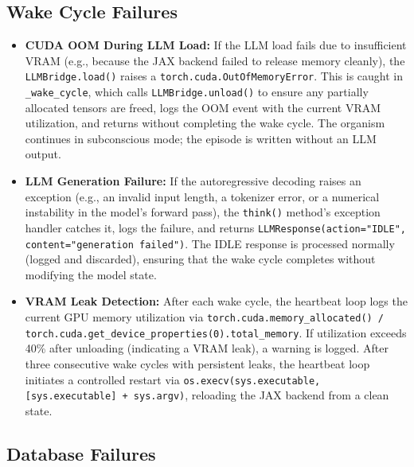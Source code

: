 \subsection{Wake Cycle Failures}

\begin{itemize}
    \item \textbf{CUDA OOM During LLM Load:} If the LLM load fails due to insufficient VRAM (e.g., because the JAX backend failed to release memory cleanly), the \texttt{LLMBridge.load()} raises a \texttt{torch.cuda.OutOfMemoryError}. This is caught in \texttt{\_wake\_cycle}, which calls \texttt{LLMBridge.unload()} to ensure any partially allocated tensors are freed, logs the OOM event with the current VRAM utilization, and returns without completing the wake cycle. The organism continues in subconscious mode; the episode is written without an LLM output.

    \item \textbf{LLM Generation Failure:} If the autoregressive decoding raises an exception (e.g., an invalid input length, a tokenizer error, or a numerical instability in the model's forward pass), the \texttt{think()} method's exception handler catches it, logs the failure, and returns \texttt{LLMResponse(action="IDLE", content="generation failed")}. The IDLE response is processed normally (logged and discarded), ensuring that the wake cycle completes without modifying the model state.

    \item \textbf{VRAM Leak Detection:} After each wake cycle, the heartbeat loop logs the current GPU memory utilization via \texttt{torch.cuda.memory\_allocated() / torch.cuda.get\_device\_properties(0).total\_memory}. If utilization exceeds 40\% after unloading (indicating a VRAM leak), a warning is logged. After three consecutive wake cycles with persistent leaks, the heartbeat loop initiates a controlled restart via \texttt{os.execv(sys.executable, [sys.executable] + sys.argv)}, reloading the JAX backend from a clean state.
\end{itemize}

\subsection{Database Failures}

